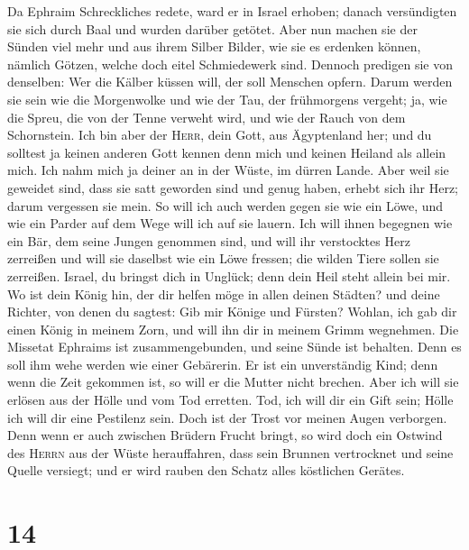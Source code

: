  Da Ephraim Schreckliches redete, ward er in Israel
erhoben; danach versündigten sie sich durch Baal und wurden darüber
getötet.  Aber nun machen sie der Sünden viel mehr und aus
ihrem Silber Bilder, wie sie es erdenken können, nämlich Götzen, welche
doch eitel Schmiedewerk sind. Dennoch predigen sie von denselben: Wer
die Kälber küssen will, der soll Menschen opfern.  Darum
werden sie sein wie die Morgenwolke und wie der Tau, der frühmorgens
vergeht; ja, wie die Spreu, die von der Tenne verweht wird, und wie der
Rauch von dem Schornstein.  Ich bin aber der
\textsc{Herr}, dein Gott, aus Ägyptenland her; und du solltest ja keinen
anderen Gott kennen denn mich und keinen Heiland als allein mich.
 Ich nahm mich ja deiner an in der Wüste, im dürren Lande.
 Aber weil sie geweidet sind, dass sie satt geworden sind
und genug haben, erhebt sich ihr Herz; darum vergessen sie mein.
 So will ich auch werden gegen sie wie ein Löwe, und wie
ein Parder auf dem Wege will ich auf sie lauern.  Ich will
ihnen begegnen wie ein Bär, dem seine Jungen genommen sind, und will ihr
verstocktes Herz zerreißen und will sie daselbst wie ein Löwe fressen;
die wilden Tiere sollen sie zerreißen.  Israel, du bringst
dich in Unglück; denn dein Heil steht allein bei mir.  Wo
ist dein König hin, der dir helfen möge in allen deinen Städten? und
deine Richter, von denen du sagtest: Gib mir Könige und Fürsten?
 Wohlan, ich gab dir einen König in meinem Zorn, und will
ihn dir in meinem Grimm wegnehmen.  Die Missetat Ephraims
ist zusammengebunden, und seine Sünde ist behalten.  Denn
es soll ihm wehe werden wie einer Gebärerin. Er ist ein unverständig
Kind; denn wenn die Zeit gekommen ist, so will er die Mutter nicht
brechen.  Aber ich will sie erlösen aus der Hölle und vom
Tod erretten. Tod, ich will dir ein Gift sein; Hölle ich will dir eine
Pestilenz sein. Doch ist der Trost vor meinen Augen verborgen.
 Denn wenn er auch zwischen Brüdern Frucht bringt, so
wird doch ein Ostwind des \textsc{Herrn} aus der Wüste herauffahren,
dass sein Brunnen vertrocknet und seine Quelle versiegt; und er wird
rauben den Schatz alles köstlichen Gerätes.

\hypertarget{section-13}{%
\section{14}\label{section-13}}

